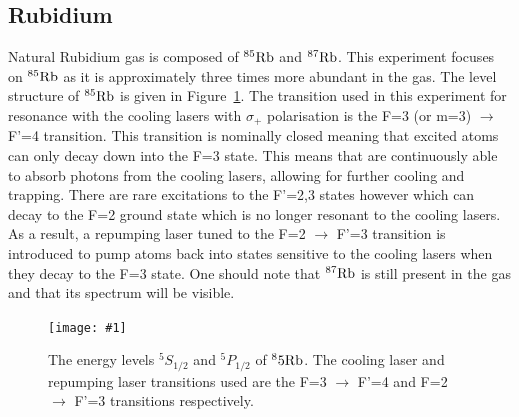 \documentclass[twocolumn]{article}
\newcommand{\insertFigure}[1]{%
   \texttt{[image: \#1]}%
}
\begin{document}
\subsection{Rubidium} \label{sec:Rubidium}
Natural Rubidium gas is composed of $^{85}\ce{Rb}$ and $^{87}\ce{Rb}$. This experiment focuses on $^{85}\ce{Rb}$ as it is approximately three times more abundant in the gas. The level structure of $^{85}\ce{Rb}$ is given in Figure~\ref{fig:Spectrum}. The transition used in this experiment for resonance with the cooling lasers with $\sigma_+$ polarisation is the F=3 (or m=3) $\to$ F'=4 transition. This transition is nominally closed meaning that excited atoms can only decay down into the F=3 state. This means that are continuously able to absorb photons from the cooling lasers, allowing for further cooling and trapping. There are rare excitations to the F'=2,3 states however which can decay to the F=2 ground state which is no longer resonant to the cooling lasers. As a result, a repumping laser tuned to the F=2 $\to$ F'=3 transition is introduced to pump atoms back into states sensitive to the cooling lasers when they decay to the F=3 state. One should note that $^{87}\ce{Rb}$ is still present in the gas and that its spectrum will be visible.
\begin{figure} [!h]
	\centering
	\insertFigure{Images/Spectrum.png}
	\caption{The energy levels $^5S_{1/2}$ and $^5P_{1/2}$ of $^85\ce{Rb}$. The cooling laser and repumping laser transitions used are the F=3 $\to$ F'=4 and F=2 $\to$ F'=3 transitions respectively.~\cite{Wieman}}
	\label{fig:Spectrum}
\end{figure}
\end{document}
